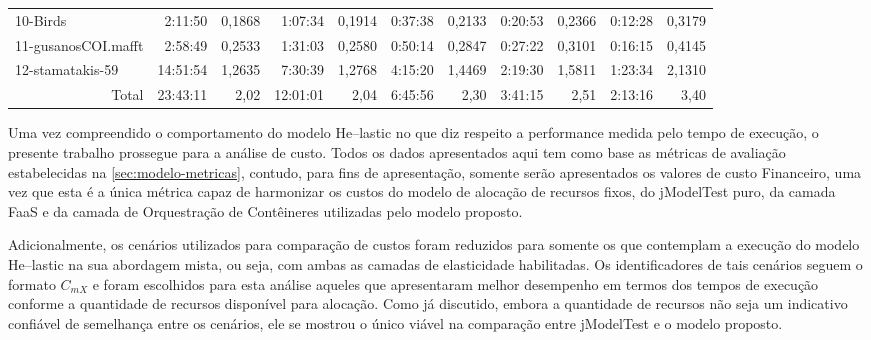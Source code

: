 \documentclass[english,brazilian]{UNISINOSmonografia} %
\begin{document}
{\begin{landscape}
\begin{table}
\begin{minipage}{\linewidth}
\begin{tabular*}{\linewidth}{@{\extracolsep{\fill}}lrrrrrrrrrr@{}}
					10-Birds & 2:11:50 & 0,1868 & 1:07:34 & 0,1914 & 0:37:38 & 0,2133 & 0:20:53 & 0,2366 & 0:12:28 & 0,3179 \\
					11-gusanosCOI.mafft & 2:58:49 & 0,2533 & 1:31:03 & 0,2580 & 0:50:14 & 0,2847 & 0:27:22 & 0,3101 & 0:16:15 & 0,4145 \\
					12-stamatakis-59 & 14:51:54 & 1,2635 & 7:30:39 & 1,2768 & 4:15:20 & 1,4469 & 2:19:30 & 1,5811 & 1:23:34 & 2,1310 \\
					\bottomrule
					\multicolumn{1}{r}{Total} & 23:43:11 & 2,02 & 12:01:01 & 2,04 & 6:45:56 & 2,30 & 3:41:15 & 2,51 & 2:13:16 & 3,40
				\end{tabular*}
			\end{minipage}
		\end{table}
	\end{landscape}
}



Uma vez compreendido o comportamento do modelo \textsf{He}--lastic no que diz respeito a performance medida pelo tempo de execução, o presente trabalho prossegue para a análise de custo.
%
Todos os dados apresentados aqui tem como base as métricas de avaliação estabelecidas na \autoref{sec:modelo-metricas}, contudo, para fins de apresentação, somente serão apresentados os valores de custo Financeiro, uma vez que esta é a única métrica capaz de harmonizar os custos do modelo de alocação de recursos fixos, do jModelTest puro, da camada FaaS e da camada de Orquestração de Contêineres utilizadas pelo modelo proposto.



Adicionalmente, os cenários utilizados para comparação de custos foram reduzidos para somente os que contemplam a execução do modelo \textsf{He}--lastic na sua abordagem mista, ou seja, com ambas as camadas de elasticidade habilitadas.
%
Os identificadores de tais cenários seguem o formato $C_{mX}$ e foram escolhidos para esta análise aqueles que apresentaram melhor desempenho em termos dos tempos de execução conforme a quantidade de recursos disponível para alocação.
%
Como já discutido, embora a quantidade de recursos não seja um indicativo confiável de semelhança entre os cenários, ele se mostrou o único viável na comparação entre jModelTest e o modelo proposto.
\end{document}
